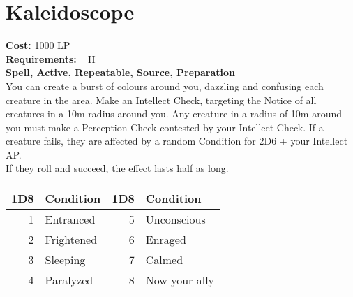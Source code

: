 \section{Kaleidoscope}\label{spell:kaleidoscope}
\textbf{Cost:} 1000 LP\\
\textbf{Requirements:} ~ II\\
\textbf{Spell, Active, Repeatable, Source, Preparation}\\
You can create a burst of colours around you, dazzling and confusing each creature in the area.
Make an Intellect Check, targeting the Notice of all creatures in a 10m radius around you.
Any creature in a radius of 10m around you must make a Perception Check contested by your Intellect Check.
If a creature fails, they are affected by a random Condition for 2D6 + your Intellect AP.\\
If they roll and succeed, the effect lasts half as long.\\

\begin{tabular}{r | l || r | l}
    1D8 & Condition & 1D8 & Condition\\
    \hline
    1 & Entranced & 5 & Unconscious \\
    2 & Frightened & 6 & Enraged \\
    3 & Sleeping & 7 & Calmed\\
    4 & Paralyzed & 8 & Now your ally \\
\end{tabular}
